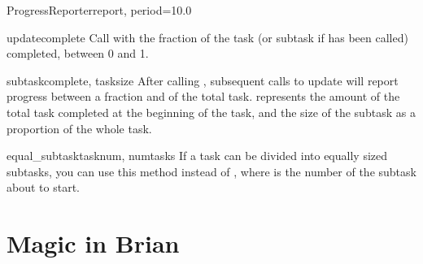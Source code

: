 \documentclass[letterpaper,10pt,english]{manual}
\begin{document}
\begin{classdesc}{ProgressReporter}{report, period=10.0}
\hypertarget{brian.ProgressReporter.update}{}\begin{methoddesc}{update}{complete}
Call with the fraction of the task (or subtask if
 has been called) completed, between
0 and 1.
\end{methoddesc}

\hypertarget{brian.ProgressReporter.subtask}{}\begin{methoddesc}{subtask}{complete, tasksize}
After calling ,
subsequent calls to update will report progress
between a fraction  and 
of the total task.  represents the amount
of the total task completed at the beginning of the
task, and  the size of the subtask as a
proportion of the whole task.
\end{methoddesc}

\hypertarget{brian.ProgressReporter.equal_subtask}{}\begin{methoddesc}{equal\_subtask}{tasknum, numtasks}
If a task can be divided into  equally
sized subtasks, you can use this method instead of
, where  is the number of
the subtask about to start.
\end{methoddesc}
\end{classdesc}

\resetcurrentobjects
\hypertarget{--doc-reference-magic}{}

\hypertarget{index-123}{}\section{Magic in Brian}
\end{document}
